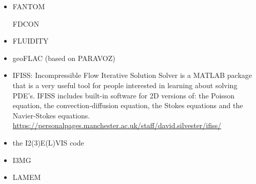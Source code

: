 \begin{itemize}
\item FANTOM

\cite{thie11}
\cite{alht11}
\cite{alht12}
\cite{alhf13}
\cite{erhv14}
\cite{thsh14}
\cite{erhv15}
\cite{erhv19}

\index FDCON
\cite{enbs05}
\cite{fusc13}
\cite{fuks15}


\item FLUIDITY
\cite{dawk11}
\cite{gagd14}

\item geoFLAC (based on PARAVOZ)
\cite{jala19}

\item IFISS: Incompressible Flow Iterative Solution Solver is a
MATLAB package that is a very useful tool for people interested in
learning about solving PDE’s.
IFISS includes built-in software for 2D versions of:
the Poisson equation, the convection-diffusion equation, the Stokes equations
and the Navier-Stokes equations.\\
\url{https://personalpages.manchester.ac.uk/staff/david.silvester/ifiss/}



\item the I2(3)E(L)VIS code

\cite{geyu03}\cite{geyu03b}\cite{geur03}
\cite{geym04}\cite{geys04}\cite{gepm04}
\cite{buge05}
\cite{bbeg06}\cite{gest06}\cite{gogc06}\cite{gecy06}
\cite{geyu07}\cite{gogc07}
\cite{scbe08}\cite{gecy08}\cite{uegs08}\cite{fagc08}\cite{zgyh09}
\cite{gefc09}
\cite{gerya2010}\cite{nigm10}
\cite{dugm11}\cite{dumg11}\cite{lixg11}\cite{gery11}\cite{geme11}
\cite{crsg12}\cite{dugk12}\cite{lixg12}
\cite{lixg13}\cite{nabg13}\cite{magc13}\cite{digd13a}\cite{digd13b}\cite{zhgt13}\cite{dyge13}\cite{gemd13}\cite{mana13}
\cite{dugs14}\cite{puge14}\cite{rugb14}\cite{voge14b}\cite{bagb14}\cite{lige14}\cite{stjm14}\cite{malg14}
\cite{buge14}\cite{gosk14}\cite{bagb14}\cite{vamd14}
\cite{duay15}\cite{uewg15}\cite{rula15}\cite{gesb15}\cite{rula15}
\cite{kobc16}\cite{magc16}\cite{fige16}
\cite{kobg19}\cite{ligc19}

\item I3MG
\cite{facc14}

\item LAMEM
\cite{scbe08}
\cite{kamm10}
\cite{lemk11}
\cite{may12}
\cite{lesh14}
\cite{cokm14}
\cite{feka14a}
\cite{feka14b}
\cite{puka15}
\cite{feka15}
\cite{cofk15}
\cite{kapb16}


\end{itemize}
